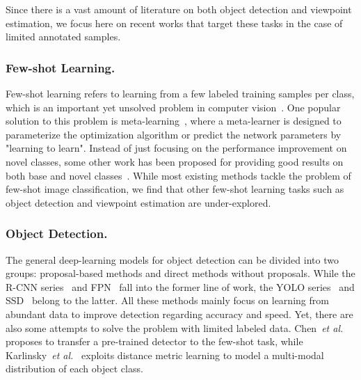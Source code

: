 \documentclass[runningheads]{llncs}
\newcommand{\etal}{\textit{et al.}\xspace}
\begin{document}
Since there is a vast amount of literature on both object detection and viewpoint estimation, we focus here on recent works that target these tasks in the case of limited annotated samples.

\subsubsection{Few-shot Learning.}
Few-shot learning refers to learning from a few labeled training samples per class, which is an important yet unsolved problem in computer vision~\cite{Li2006OneshotLO,Hariharan2016LowShotVR,Vinyals2016MatchingNF}. One popular solution to this problem is meta-learning~\cite{Koch2015SiameseNN,Bertinetto2016LearningFO,Andrychowicz16,Wang2016LearningTL,Vinyals2016MatchingNF,Snell2017PrototypicalNF,Hu2017RelationNF,Ravi2017OptimizationAA,HyperNetworks45823,lee2019meta,Hu2020Empirical}, where a meta-learner is designed to parameterize the optimization algorithm or predict the network parameters by "learning to learn".
Instead of just focusing on the performance improvement on novel classes, some other work has been proposed for providing good results on both base and novel classes~\cite{Hariharan2016LowShotVR,Gidaris2018DynamicFV,Qi2017LowShotLW}.
While most existing methods tackle the problem of few-shot image classification, we find that other few-shot learning tasks such as object detection and viewpoint estimation are under-explored.

\subsubsection{Object Detection.}
The general deep-learning models for object detection can be divided into two groups: proposal-based methods and direct methods without proposals.
While the R-CNN series~\cite{14rcnn,He2014SpatialPP,girshickICCV15fastrcnn,renNIPS15fasterrcnn,He2017MaskR} and FPN~\cite{Lin2016FeaturePN} fall into the former line of work, the YOLO series~\cite{Redmon2015YouOL,Redmon2016YOLO9000BF,Redmon2018YOLOv3AI} and SSD~\cite{Liu2016SSDSS} belong to the latter.
All these methods mainly focus on learning from abundant data to improve detection regarding accuracy and speed. Yet, there are also some attempts to solve the problem with limited labeled data.
Chen~\etal~\cite{LSTD2018} proposes to transfer a pre-trained detector to the few-shot task, while Karlinsky~\etal~\cite{Schwartz2018RepMetRM} exploits distance metric learning to model a multi-modal distribution of each object class.
\end{document}
